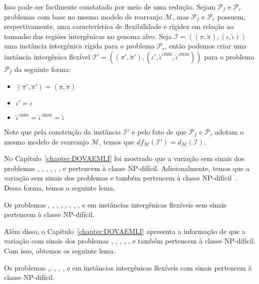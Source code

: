 Isso pode ser facilmente constatado por meio de uma redução. Sejam $\mathcal{P}_f$ e $\mathcal{P}_r$ problemas com base no mesmo modelo de rearranjo $\mathcal{M}$, mas $\mathcal{P}_f$ e $\mathcal{P}_r$ possuem, respectivamente, uma característica de flexibilidade e rígidez em relação ao tamanho das regiões intergênicas no genoma alvo. Seja $\mathcal{I}=((\pi,\breve\pi),(\iota,\breve\iota))$ uma instância intergênica rígida para o problema $\mathcal{P}_r$, então podemos criar uma instância intergênica flexível $\mathcal{I'} = ((\pi',\breve\pi'),(\iota',\breve\iota'^{\min},\breve\iota'^{\max}))$ para o problema $\mathcal{P}_f$ da seguinte forma:

\begin{itemize}
  \item $(\pi',\breve\pi') = (\pi,\breve\pi)$
  \item $\iota' = \iota$
  \item $\breve\iota'^{\min} = \breve\iota'^{\max} = \breve\iota$
\end{itemize}

Note que pela construção da instância $\mathcal{I'}$ e pelo fato de que $\mathcal{P}_f$ e $\mathcal{P}_r$ adotam o mesmo modelo de rearranjo $\mathcal{M}$, temos que $df_{\mathcal{M}}(\mathcal{I'}) = d_{\mathcal{M}}(\mathcal{I})$.

No Capítulo~\ref{chapter:DOVAEMLI} foi mostrado que a variação sem sinais dos problemas \SbIR{}, \SbIRI{}, \SbIRM{}, \SbIRMI{}, \SbIRT{}, \SbIRTI{}, \SbIRTM{} e \SbIRTMI{} pertencem à classe NP-difícil. Adicionalmente, temos que a variação sem sinais dos problemas \SbIT{} e \SbITM{} também pertencem à classe NP-difícil~\cite{2021a-oliveira-etal}. Dessa forma, temos o seguinte lema.

\begin{lemma}\label{lemma:BEBGUYUB}
Os problemas \SbFIR{}, \SbFIRI{}, \SbFIRM{}, \SbFIRMI{}, \SbFIRT{}, \SbFIRTI{}, \SbFIRTM{}, \SbFIRTMI{}, \SbFIT{} e \SbFITM{} em instâncias intergênicas flexíveis sem sinais pertencem à classe NP-difícil.
\end{lemma}

Além disso, o Capítulo~\ref{chapter:DOVAEMLI} apresenta a informação de que a variação com sinais dos problemas \SbIR{}, \SbIRM{}, \SbIRMI{}, \SbIRT{}, \SbIRTI{}, \SbIRTM{} e \SbIRTMI{} também pertencem à classe NP-difícil. Com isso, obtemos os seguinte lema.

\begin{lemma}\label{lemma:XPRZJZES}
Os problemas \SbFIR{},\SbFIRM{}, \SbFIRMI{}, \SbFIRT{}, \SbFIRTI{}, \SbFIRTM{} e \SbFIRTMI{} em instâncias intergênicas flexíveis com sinais pertencem à classe NP-difícil.
\end{lemma}

